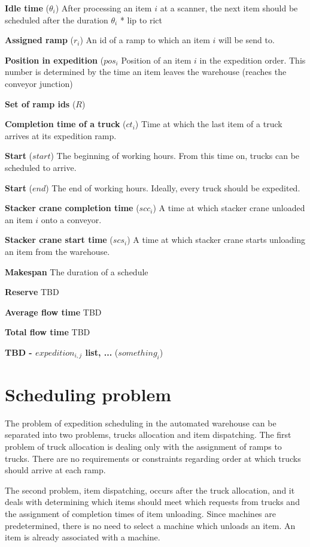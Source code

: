 \documentclass{ctuthesis}
\begin{document}
\noindent \textbf{Idle time} ($\theta_i$) After processing an item $i$ at a scanner, the next item should be scheduled after the duration $\theta_i$ * lip to rict

\noindent \textbf{Assigned ramp} ($r_i$) An id of a ramp to which an item $i$ will be send to.

\noindent \textbf{Position in expedition} ($pos_i$ Position of an item $i$ in the expedition order. This number is determined by the time an item leaves the warehouse (reaches the conveyor junction)

\noindent \textbf{Set of ramp ids} ($R$) 

\noindent \textbf{Completion time of a truck} ($ct_i$) Time at which the last item of a truck arrives at its expedition ramp.

\noindent \textbf{Start} ($start$) The beginning of working hours. From this time on, trucks can be scheduled to arrive.

\noindent \textbf{Start} ($end$) The end of working hours. Ideally, every truck should be expedited.

\noindent \textbf{Stacker crane completion time} ($scc_i$) A time at which stacker crane unloaded an item $i$ onto a conveyor.

\noindent \textbf{Stacker crane start time} ($scs_i$) A time at which stacker crane starts unloading an item from the warehouse.

\noindent \textbf{Makespan} The duration of a schedule

\noindent \textbf{Reserve} TBD

\noindent \textbf{Average flow time} TBD

\noindent \textbf{Total flow time} TBD

\noindent \textbf{TBD - $expedition_{i,j}$ list, ... } ($something_i$)


\section{Scheduling problem}
 
 The problem of expedition scheduling in the automated warehouse can be separated into two problems, trucks allocation and item dispatching. The first problem of truck allocation is dealing only with the assignment of ramps to trucks. There are no requirements or constraints regarding order at which trucks should arrive at each ramp.
 
 The second problem, item dispatching, occurs after the truck allocation, and it deals with determining which items should meet which requests from trucks and the assignment of completion times of item unloading. Since machines are predetermined, there is no need to select a machine which unloads an item. An item is already associated with a machine.
 
\end{document}
